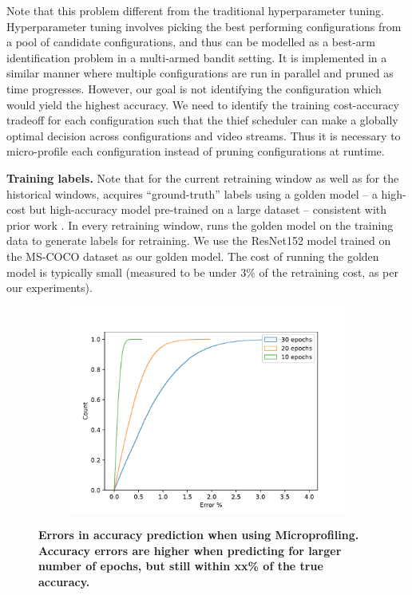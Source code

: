 
Note that this problem different from the traditional hyperparameter tuning\cite{hyperband, asha}. Hyperparameter tuning involves picking the best performing configurations from a pool of candidate configurations, and thus can be modelled as a best-arm identification problem in a multi-armed bandit setting. It is implemented in a similar manner where multiple configurations are run in parallel and pruned as time progresses. However, our goal is not identifying the configuration which would yield the highest accuracy. We need to identify the training cost-accuracy tradeoff for each configuration such that the thief scheduler can make a globally optimal decision across configurations and video streams. Thus it is necessary to micro-profile each configuration instead of pruning configurations at runtime. 

{\bf Training labels.} Note that for the current retraining window as well as for the historical windows, {\name} acquires ``ground-truth'' labels using a golden model -- a high-cost but high-accuracy model pre-trained on a large dataset -- consistent with prior work \cite{incremental-13, mullapudi2019, incremental-15, distribution-20}. In every retraining window, {\name} runs the golden model on the training data to generate labels for retraining. We use the ResNet152 model trained on the MS-COCO dataset as our golden model. The cost of running the golden model is typically small (measured to be under $3\%$ of the retraining cost, as per our experiments).

\begin{figure}
  \centering
  \begin{subfigure}[t]{\linewidth}
    \centering
    \includegraphics[width=0.9\linewidth]{results/microprofiling_dummy.pdf}
  \end{subfigure}
  \caption{\bf\small Errors in accuracy prediction when using Microprofiling. Accuracy errors are higher when predicting for larger number of epochs, but still within xx\% of the true accuracy.}
  \label{fig:multicam-cities}
\end{figure}

